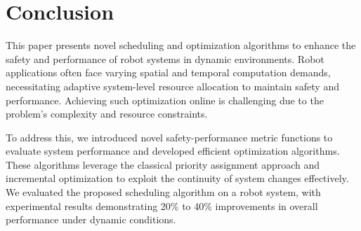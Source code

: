 
	\section{Conclusion}
    This paper presents novel scheduling and optimization algorithms to enhance the safety and performance of robot systems in dynamic environments. Robot applications often face varying spatial and temporal computation demands, necessitating adaptive system-level resource allocation to maintain safety and performance. Achieving such optimization online is challenging due to the problem's complexity and resource constraints.

    To address this, we introduced novel safety-performance metric functions to evaluate system performance and developed efficient optimization algorithms. These algorithms leverage the classical priority assignment approach and incremental optimization to exploit the continuity of system changes effectively. We evaluated the proposed scheduling algorithm on a robot system, with experimental results demonstrating 20\% to 40\% improvements in overall performance under dynamic conditions.